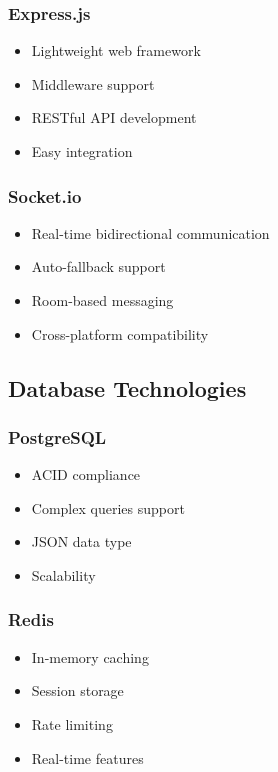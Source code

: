 \subsubsection{Express.js}
\begin{itemize}
    \item Lightweight web framework
    \item Middleware support
    \item RESTful API development
    \item Easy integration
\end{itemize}

\subsubsection{Socket.io}
\begin{itemize}
    \item Real-time bidirectional communication
    \item Auto-fallback support
    \item Room-based messaging
    \item Cross-platform compatibility
\end{itemize}

\subsection{Database Technologies}
\label{subsec:database-tech}

\subsubsection{PostgreSQL}
\begin{itemize}
    \item ACID compliance
    \item Complex queries support
    \item JSON data type
    \item Scalability
\end{itemize}

\subsubsection{Redis}
\begin{itemize}
    \item In-memory caching
    \item Session storage
    \item Rate limiting
    \item Real-time features
\end{itemize}

